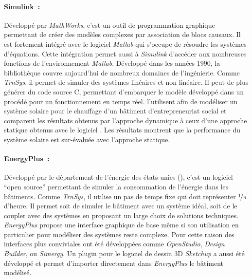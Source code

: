 \paragraph{Simulink~:} %
\label{par:simulink}
Développé par \textit{MathWorks}, c’est un outil de programmation graphique permettant de
créer des modèles complexes par association de blocs causaux. Il est fortement intégré
avec le logiciel \textit{Matlab} qui s’occupe de résoudre les systèmes d’équations. Cette
intégration permet aussi à  \textit{Simulink} d’accéder aux nombreuses fonctions de
l’environnement \textit{Matlab}.
Développé dans les années $1990$, la bibliothèque couvre
aujourd’hui de nombreux domaines de l’ingénierie. Comme \textit{TrnSys}, il permet de
simuler des systèmes linéaires et non-linéaire. Il peut de plus générer du code source C,
permettant d’embarquer le modèle développé dans un procédé pour un fonctionnement en temps
réel. \textcite{Mosallat2013686} l’utilisent afin de modéliser un système solaire pour le
chauffage d’un bâtiment d’entrepreneuriat social et comparent les résultats obtenus par
l’approche dynamique à ceux d’une approche statique obtenus avec le logiciel
. Les résultats montrent que la performance
du système solaire est sur-évaluée avec l’approche statique.

\paragraph{EnergyPlus~:} %
\label{par:energyplus}
Développé par le département de l’énergie des états-unies (), c’est un logiciel
\enquote{open source} permettant de simuler la consommation de l’énergie dans les
bâtiments. Comme \textit{TrnSys}, il utilise un pas de temps fixe qui doit représenter
$\nicefrac{1}{n}$ d’heure. Il permet soit de simuler le bâtiment avec un système
idéal, soit de le coupler avec des systèmes en proposant un large choix de solutions
techniques. \textit{EnergyPlus} propose une interface graphique de base même si son
utilisation en particulier pour modéliser des systèmes reste complexe. Pour cette raison
des interfaces plus conviviales ont été développées comme \textit{OpenStudio},
\textit{Design Builder}, ou \textit{Simergy}. Un plugin pour le
logiciel de dessin $3$D \textit{Sketchup} a aussi été développé et permet d’importer
directement dans \textit{EnergyPlus} le bâtiment modélisé.

